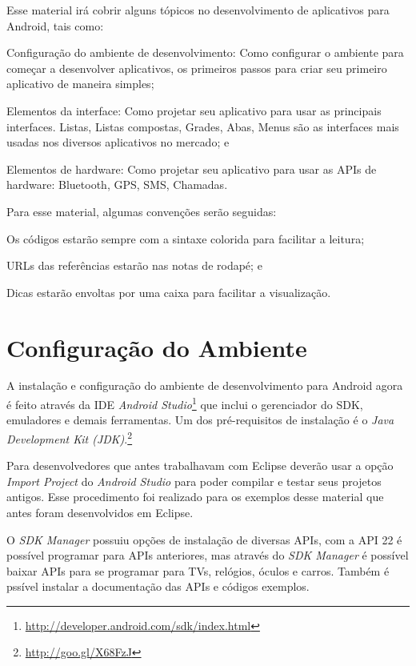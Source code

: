 \documentclass[a4paper,12pt,brazil,oneside]{book}
\begin{document}
Esse material irá cobrir alguns tópicos no desenvolvimento de aplicativos para Android, tais como:
\bi
  \item Configuração do ambiente de desenvolvimento: Como configurar o ambiente para começar a desenvolver aplicativos, os primeiros passos para criar seu primeiro aplicativo de maneira simples;
  \item Elementos da interface: Como projetar seu aplicativo para usar as principais interfaces. Listas, Listas compostas, Grades, Abas, Menus são as interfaces mais usadas nos diversos aplicativos no mercado; e
  \item Elementos de hardware: Como projetar seu aplicativo para usar as APIs de hardware: Bluetooth, GPS, SMS, Chamadas.
\ei

Para esse material, algumas convenções serão seguidas: 
\bi
  \item Os códigos estarão sempre com a sintaxe colorida para facilitar a leitura;
  \item URLs das referências estarão nas notas de rodapé; e
  \item Dicas estarão envoltas por uma caixa para facilitar a visualização.
\ei

\newpage

\section{Configuração do Ambiente}

A instalação e configuração do ambiente de desenvolvimento para Android agora é feito através da IDE \emph{Android Studio}\footnote{\href{Android Studio}{http://developer.android.com/sdk/index.html}} que inclui o gerenciador do SDK, emuladores e demais ferramentas. Um dos pré-requisitos de instalação é o \emph{Java Development Kit (JDK)}.\footnote{\href{JDK}{http://goo.gl/X68FzJ}}

Para desenvolvedores que antes trabalhavam com Eclipse deverão usar a opção \emph{Import Project} do \emph{Android Studio} para poder compilar e testar seus projetos antigos. Esse procedimento foi realizado para os exemplos desse material que antes foram desenvolvidos em Eclipse.

O \emph{SDK Manager} possuiu opções de instalação de diversas APIs, com a API 22 é possível programar para APIs anteriores, mas através do \emph{SDK Manager} é possível baixar APIs para se programar para TVs, relógios, óculos e carros. Também é pssível instalar a documentação das APIs e códigos exemplos.
\end{document}
